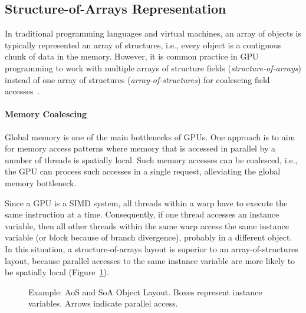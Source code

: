\documentclass[preprint]{sigplanconf}
\begin{document}
\subsection{Structure-of-Arrays Representation}
In traditional programming languages and virtual machines, an array of objects is typically represented an array of structures, i.e., every object is a contiguous chunk of data in the memory. However, it is common practice in GPU programming to work with multiple arrays of structure fields (\emph{structure-of-arrays}) instead of one array of structures (\emph{array-of-structures}) for coalescing field accesses~\cite{Mei2016, Abel:1999:ATS}.

\paragraph{Memory Coalescing}
Global memory is one of the main bottlenecks of GPUs. One approach is to aim for memory access patterns where memory that is accessed in parallel by a number of threads is spatially local. Such memory accesses can be coalesced, i.e., the GPU can process such accesses in a single request, alleviating the global memory bottleneck.

Since a GPU is a SIMD system, all threads within a warp have to execute the same instruction at a time. Consequently, if one thread accesses an instance variable, then all other threads within the same warp access the same instance variable (or block because of branch divergence), probably in a different object. In this situation, a structure-of-arrays layout is superior to an array-of-structures layout, because parallel accesses to the same instance variable are more likely to be spatially local (Figure~\ref{fig:ex_obj_layout}).

\begin{figure}[!htp]
    \centering
    
    \caption{Example: AoS and SoA Object Layout. Boxes represent instance variables. Arrows indicate parallel access.}
    \label{fig:ex_obj_layout}%
\end{figure}
\end{document}
